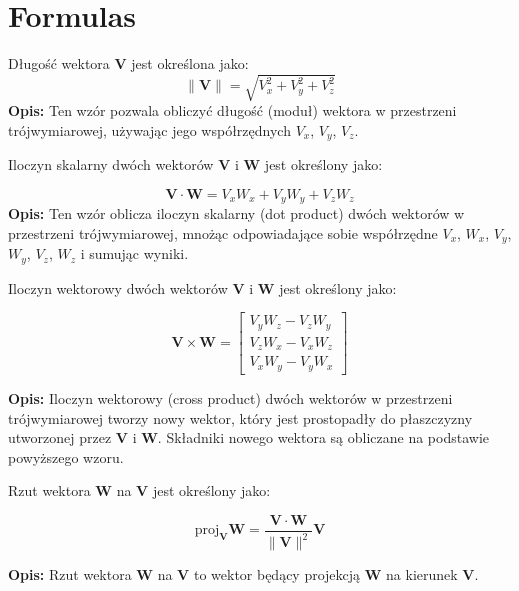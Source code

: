 \section{Formulas}


Długość wektora \( \mathbf{V} \) jest określona jako:
\[
\|\mathbf{V}\| = \sqrt{V_x^2 + V_y^2 + V_z^2}
\]
\textbf{Opis:} Ten wzór pozwala obliczyć długość (moduł) wektora w przestrzeni trójwymiarowej, używając jego współrzędnych \( V_x \), \( V_y \), \( V_z \).

\vspace{1em}
\noindent
Iloczyn skalarny dwóch wektorów \( \mathbf{V} \) i \( \mathbf{W} \) jest określony jako:

\[
\mathbf{V} \cdot \mathbf{W} = V_x W_x + V_y W_y + V_z W_z
\]
\noindent
\textbf{Opis:} Ten wzór oblicza iloczyn skalarny (dot product) dwóch wektorów w przestrzeni trójwymiarowej, mnożąc odpowiadające sobie współrzędne \( V_x \), \( W_x \), \( V_y \), \( W_y \), \( V_z \), \( W_z \) i sumując wyniki.


\vspace{1em}
\noindent
Iloczyn wektorowy dwóch wektorów \( \mathbf{V} \) i \( \mathbf{W} \) jest określony jako:

\[
\mathbf{V} \times \mathbf{W} = 
\begin{bmatrix}
V_y W_z - V_z W_y \\
V_z W_x - V_x W_z \\
V_x W_y - V_y W_x
\end{bmatrix}
\]

\vspace{1em}
\noindent
\textbf{Opis:} Iloczyn wektorowy (cross product) dwóch wektorów w przestrzeni trójwymiarowej tworzy nowy wektor, który jest prostopadły do płaszczyzny utworzonej przez \( \mathbf{V} \) i \( \mathbf{W} \). Składniki nowego wektora są obliczane na podstawie powyższego wzoru.



\vspace{1em}
\noindent
Rzut wektora \( \mathbf{W} \) na \( \mathbf{V} \) jest określony jako:

\[
\text{proj}_{\mathbf{V}} \mathbf{W} = \frac{\mathbf{V} \cdot \mathbf{W}}{\|\mathbf{V}\|^2} \mathbf{V}
\]

\vspace{1em}
\noindent
\textbf{Opis:} Rzut wektora \( \mathbf{W} \) na \( \mathbf{V} \) to wektor będący projekcją \( \mathbf{W} \) na kierunek \( \mathbf{V} \).




